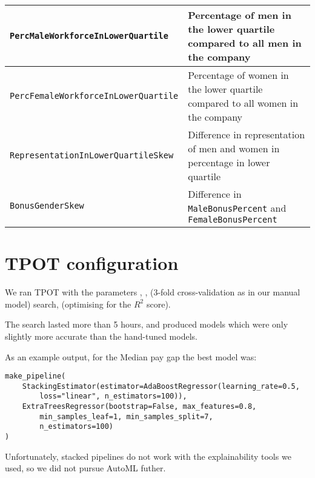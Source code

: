 \begin{centering}
{\begin{tabular}{|l|p{9cm}|}
        \texttt{PercMaleWorkforceInLowerQuartile} & Percentage of men in the lower quartile compared to all men in the company\\ \hline
        \texttt{PercFemaleWorkforceInLowerQuartile} & Percentage of women in the lower quartile compared to all women in the company\\ \hline
        \texttt{RepresentationInLowerQuartileSkew} & Difference in representation of men and women in percentage in lower quartile\\ \hline
        
        \texttt{BonusGenderSkew} & Difference in \texttt{MaleBonusPercent} and \texttt{FemaleBonusPercent} \\ \hline
        
    \end{tabular} 
    }

\end{centering}



\section{TPOT configuration}
\label{tpot-config}

We ran TPOT with the parameters 
,
, 
 (3-fold cross-validation as in our manual model)
search,
 (optimising for the $R^2$ score).

The search lasted more than 5 hours, and produced models which were only slightly more accurate than the hand-tuned models.

As an example output, for the Median pay gap the best model was:

\begin{scriptsize}
\begin{verbatim}
make_pipeline(
    StackingEstimator(estimator=AdaBoostRegressor(learning_rate=0.5,
        loss="linear", n_estimators=100)),
    ExtraTreesRegressor(bootstrap=False, max_features=0.8, 
        min_samples_leaf=1, min_samples_split=7, 
        n_estimators=100)
)
\end{verbatim}
\end{scriptsize}

Unfortunately, stacked pipelines do not work with the explainability tools we used, so we did not pursue AutoML futher.


